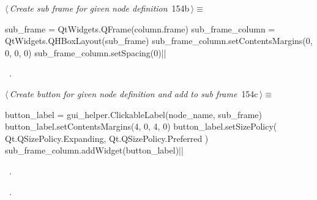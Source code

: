 \documentclass[%
    a4paper,    %
    justified,  %
    nobib,      %
    openany     %
]{tufte-book}
\begin{document}
%
\begin{flushleft} \small
\begin{minipage}{\linewidth}\label{scrap160}\raggedright\small
{} $\langle\,${\itshape Create sub frame for given node definition}\nobreak\ {\footnotesize {154b}}$\,\rangle\equiv$
\vspace{-1ex}
\begin{pythoncode}
    sub_frame = QtWidgets.QFrame(column.frame)
    sub_frame_column = QtWidgets.QHBoxLayout(sub_frame)
    sub_frame_column.setContentsMargins(0, 0, 0, 0)
    sub_frame_column.setSpacing(0)|\NWsep|
\end{pythoncode}
\vspace{1.5ex}
\footnotesize
\begin{list}{}{\setlength{\itemsep}{-\parsep}\setlength{\itemindent}{-\leftmargin}}
\item \NWtxtMacroRefIn\ .

\item{}
\end{list}
\end{minipage}\vspace{4ex}
\end{flushleft}
%
\begin{flushleft} \small
\begin{minipage}{\linewidth}\label{scrap161}\raggedright\small
{} $\langle\,${\itshape Create button for given node definition and add to sub frame}\nobreak\ {\footnotesize {154c}}$\,\rangle\equiv$
\vspace{-1ex}
\begin{pythoncode}
    button_label = gui_helper.ClickableLabel(node_name, sub_frame)
    button_label.setContentsMargins(4, 0, 4, 0)
    button_label.setSizePolicy(
        Qt.QSizePolicy.Expanding, Qt.QSizePolicy.Preferred
    )
    sub_frame_column.addWidget(button_label)|\NWsep|
\end{pythoncode}
\vspace{1.5ex}
\footnotesize
\begin{list}{}{\setlength{\itemsep}{-\parsep}\setlength{\itemindent}{-\leftmargin}}
\item \NWtxtMacroDefBy\ .
\item \NWtxtMacroRefIn\ .

\item{}
\end{list}
\end{minipage}\vspace{4ex}
\end{flushleft}
\end{document}
